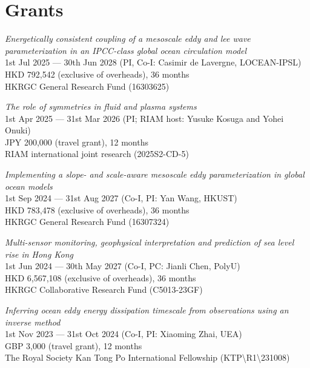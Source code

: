 \documentclass[letterpaper]{article}
\renewenvironment{itemize}{
  \begin{list}{}{
    \setlength{\leftmargin}{1.5em}
  }
}{
  \end{list}
}
\begin{document}
\section*{Grants}

\begin{itemize}

\item[--] \textit{Energetically consistent coupling of a mesoscale eddy and lee wave parameterization in an IPCC-class global ocean circulation model}\\
1st Jul 2025 --- 30th Jun 2028 (PI, Co-I: Casimir de Lavergne, LOCEAN-IPSL)\\
HKD 792,542 (exclusive of overheads), 36 months\\
HKRGC General Research Fund (16303625)

\item[--] \textit{The role of symmetries in fluid and plasma systems}\\
1st Apr 2025 --- 31st Mar 2026 (PI; RIAM host: Yusuke Kosuga and Yohei Onuki)\\
JPY 200,000 (travel grant), 12 months\\
RIAM international joint research (2025S2-CD-5)

\item[--] \textit{Implementing a slope- and scale-aware mesoscale eddy parameterization in global ocean models}\\
1st Sep 2024 --- 31st Aug 2027 (Co-I, PI: Yan Wang, HKUST)\\
HKD 783,478 (exclusive of overheads), 36 months\\
HKRGC General Research Fund (16307324)

\item[--] \textit{Multi-sensor monitoring, geophysical interpretation and prediction of sea level rise in Hong Kong}\\
1st Jun 2024 --- 30th May 2027 (Co-I, PC: Jianli Chen, PolyU)\\
HKD 6,567,108 (exclusive of overheads), 36 months\\
HKRGC Collaborative Research Fund (C5013-23GF)

\item[--] \textit{Inferring ocean eddy energy dissipation timescale from observations using an inverse method}\\
1st Nov 2023 --- 31st Oct 2024 (Co-I, PI: Xiaoming Zhai, UEA)\\
GBP 3,000 (travel grant), 12 months\\
The Royal Society Kan Tong Po International Fellowship (KTP\textbackslash R1\textbackslash 231008)


\end{itemize}
\end{document}
